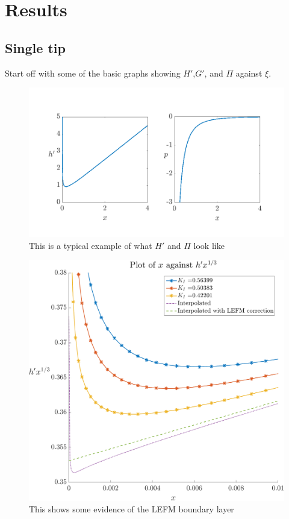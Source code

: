 \documentclass{jfm}
\begin{document}
\section{Results}\label{sec:Results}
%
%
%
\subsection{Single tip}
Start off with some of the basic graphs showing $H'$,$G'$, and $\Pi$ against
$\xi$.
\begin{figure}
  \centerline{\includegraphics[scale=0.3]{./../../Graphs/hprime-p-x-full.png}}
  \caption{This is a typical example of what $H'$ and $\Pi$ look like}
\end{figure}
\begin{figure}
  \centerline{\includegraphics[scale=0.3]{./../../Graphs/hprime-x.pdf}}
  \caption{This shows some evidence of the LEFM boundary layer}
\end{figure}
\end{document}
